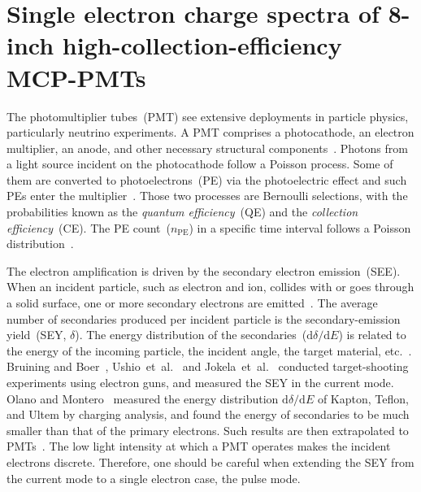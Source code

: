\section{Single electron charge spectra of 8-inch high-collection-efficiency MCP-PMTs}\label{sec:Introduction}
The photomultiplier tubes~(PMT) see extensive deployments in particle physics, particularly neutrino experiments.
A PMT comprises a photocathode, an electron multiplier, an anode, and other necessary structural components~\cite{1955Scintillation}.
Photons from a light source incident on the photocathode follow a Poisson process.
Some of them are converted to photoelectrons~(PE) via the photoelectric effect
and such PEs enter the multiplier~\cite{2016Optimization}.
Those two processes are Bernoulli selections, with the probabilities known as the \emph{quantum efficiency}~(QE) and the \emph{collection efficiency}~(CE).
The PE count~($n_{\mathrm{PE}}$) in a specific time interval follows a Poisson distribution~\cite{1994Absolute}.

The electron amplification is driven by the secondary electron emission~(SEE).
When an incident particle, such as electron and ion, collides with or goes through a solid surface, one or more secondary electrons are emitted~\cite{2016Secondary}.
The average number of secondaries produced per incident particle is the secondary-emission yield~(SEY, $\delta$).
The energy distribution of the secondaries~(\(\mathrm{d}\delta/\mathrm{d}E\)) is related to the energy of the incoming particle,
the incident angle, the target material, etc.~\cite{2002Probabilistic}.
Bruining and Boer~\cite{1938Secondary}, Ushio~et~al.~\cite{1988Secondary} and Jokela~et~al.~\cite{2012Secondary}
conducted target-shooting experiments using electron guns,
and measured the SEY in the current mode.
Olano and Montero~\cite{OLANO2020103456} measured the energy distribution \(\mathrm{d}\delta/\mathrm{d}E\) of Kapton, Teflon, and Ultem by charging analysis,
and found the energy of secondaries to be much smaller than that of the primary electrons.
Such results are then extrapolated to PMTs~\cite{2012An,2021Effects}.
The low light intensity at which a PMT operates makes the incident electrons discrete.
Therefore, one should be careful when extending the SEY from the current mode to a single electron case, the pulse mode.

